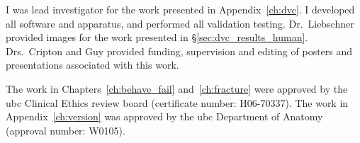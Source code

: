 I was lead investigator for the work presented in Appendix~\ref{ch:dvc}.
I developed all software and apparatus, and performed all validation testing.
Dr.\ Liebschner provided images for the work presented in \S\ref{sec:dvc_results_human}.
Drs.\ Cripton and Guy provided funding, supervision and editing of posters and presentations associated with this work.

The work in Chapters~\ref{ch:behave_fail} and~\ref{ch:fracture} were approved by the \ac{ubc} Clinical Ethics review board (certificate number: H06-70337).
The work in Appendix~\ref{ch:version} was approved by the \ac{ubc} Department of Anatomy (approval number: W0105).